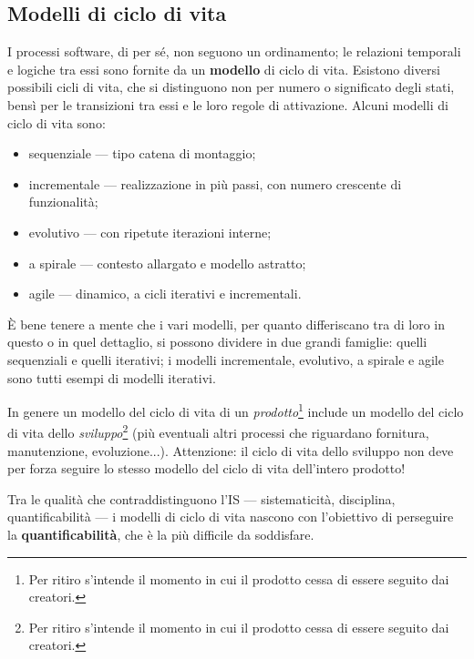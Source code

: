 \documentclass[a4paper]{article}
\begin{document}
		
	\subsection{Modelli di ciclo di vita}

		
I processi software, di per sé, non seguono un ordinamento; le relazioni temporali e logiche tra essi sono fornite da un \textbf{modello} di ciclo di vita. Esistono diversi possibili cicli di vita, che si distinguono non per numero o significato degli stati, bensì per le transizioni tra essi e le loro regole di attivazione. Alcuni modelli di ciclo di vita sono:
		
	\begin{itemize}
		
			
	\item sequenziale — tipo catena di montaggio;
			
	\item incrementale — realizzazione in più passi, con numero crescente di funzionalità;
			
	\item evolutivo — con ripetute iterazioni interne;
			
	\item a spirale — contesto allargato e modello astratto;
			
	\item agile — dinamico, a cicli iterativi e incrementali.
		
	\end{itemize}

		
È bene tenere a mente che i vari modelli, per quanto differiscano tra di loro in questo o in quel dettaglio, si possono dividere in due grandi famiglie: quelli sequenziali e quelli iterativi; i modelli incrementale, evolutivo, a spirale e agile sono tutti esempi di modelli iterativi.
		
In genere un modello del ciclo di vita di un \emph{prodotto}\footnote{Per ritiro s'intende il momento in cui il prodotto cessa di essere seguito dai creatori.} include un modello del ciclo di vita dello \emph{sviluppo}\footnote{Per ritiro s'intende il momento in cui il prodotto cessa di essere seguito dai creatori.} (più eventuali altri processi che riguardano fornitura, manutenzione, evoluzione...). Attenzione: il ciclo di vita dello sviluppo non deve per forza seguire lo stesso modello del ciclo di vita dell'intero prodotto!
		
Tra le qualità che contraddistinguono l'IS — sistematicità, disciplina, quantificabilità — i modelli di ciclo di vita nascono con l'obiettivo di perseguire la \textbf{quantificabilità}, che è la più difficile da soddisfare.
\end{document}
